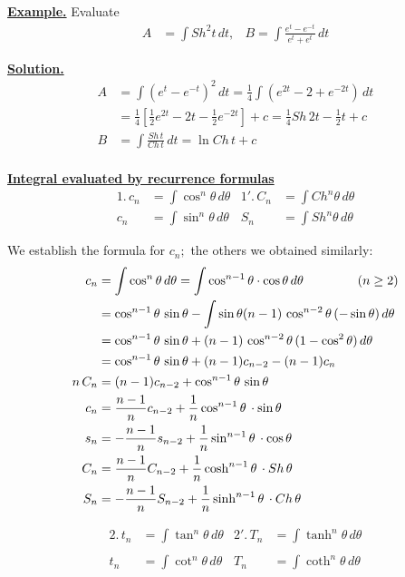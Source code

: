 \documentclass[10pt, a4paper]{article}
\begin{document}
\newtheorem{example}{Example}
\textbf{\underline{Example.}} Evaluate 
\begin{align*}
	A &=\int Sh^{2}t\, dt, & B = \int  \frac{e^{t} - e^{-t}}{e^{t} + e^{t}} \, dt
\end{align*}	

\textbf{\underline{Solution.}}\\
\begin{align*}
A &= \int (e^{t}-e^{-t})^{2} \, dt=\frac{1}{4}\int(e^{2t}-2+e^{-2t}) \, dt\\ 
&= \frac{1}{4} [\frac{1}{2} e^{2t}-2t-\frac{1}{2}e^{-2t} ] + c =\frac{1}{4} Sh \, 2t-\frac{1}{2}t+c\\ 
B&=\int\frac{Sh \, t}{Ch \, t} \, dt = \ln Ch \, t+c\\ 	
\end{align*}

\underline{\textbf{Integral evaluated by recurrence formulas}}	
\begin{align*}
1. \, c_{n} &=\int \cos ^{n}\theta \, d\theta &  1'. \, C_{n} &= \int Ch^{n}\theta \, d\theta \\ 
c_{n}&=\int \sin^{n}\theta \, d\theta&  S_{n} &= \int Sh^{n}\theta \, d\theta  
\end{align*}

We establish the formula for 
$c_{n};
$
the others we obtained similarly: \\ 
\begin{align*}
c_{n}&=\int \cos^{n}\theta \, d\theta=\int \cos^{n-1}\theta \cdot \cos\theta \, d\theta \hspace{1,5cm} (n\ge2)\\ 
&= \cos^{n-1}\theta \, \sin\theta - \int\sin\theta (n-1) \, \cos^{n-2}\theta \, (-\sin\theta) \, d\theta\\ 
&= \cos^{n-1}\theta \, \sin\theta +(n-1) \, \cos^{n-2}\theta \, (1-\cos^{2}\theta) \, d\theta\\ 
&= \cos^{n-1}\theta \, \sin\theta + (n-1) c_{n-2}-(n-1)c_{n}\\  
n \, C_{n}&=(n-1)c_{n-2}+\cos^{n-1}\theta  \, \sin\theta \\
c_{n}&=\frac{n-1}{n}c_{n-2}+\frac{1}{n}\cos^{n-1}\theta  \, \cdot \sin\theta\\ 
s_{n}&=-\frac{n-1}{n}s_{n-2}+\frac{1}{n}\sin^{n-1}\theta \, \cdot \cos\theta \\ 
C_{n}&=\frac{n-1}{n}C_{n-2}+\frac{1}{n}\cosh^{n-1}\theta  \, \cdot Sh  \,\theta\\ 
S_{n}&=-\frac{n-1}{n}S_{n-2}+\frac{1}{n}\sinh^{n-1}\theta \, \cdot Ch \, \theta \\
\end{align*}

\begin{align*}
2. \, t_{n}	&=\int\tan^{n}\theta \,  d\theta  &  2'. \, T_{n} &= \int \tanh^{n}\theta \, d\theta \\ \\
t_{n}	&=\int\cot^{n}\theta \, d\theta   & T_{n} &= \int \coth^{n}\theta \, d\theta \\
\end{align*}
\end{document}
